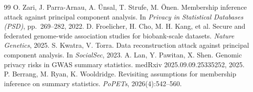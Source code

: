 \documentclass[11pt]{article}
\begin{document}
\begin{thebibliography}{99}
 O. Zari, J. Parra-Arnau, A. \"Unsal, T. Strufe, M. \"Onen. Membership inference attack against principal component analysis. In \emph{Privacy in Statistical Databases (PSD)}, pp.~269--282, 2022.
 D. Froelicher, H. Cho, M. H. Kang, et al. Secure and federated genome-wide association studies for biobank-scale datasets. \emph{Nature Genetics}, 2025.
 S. Kwatra, V. Torra. Data reconstruction attack against principal component analysis. In \emph{SocialSec}, 2023.
 A. Lan, Y. Pawitan, X. Shen. Genomic privacy risks in GWAS summary statistics. medRxiv 2025.09.09.25335252, 2025.
 P. Berrang, M. Ryan, K. Wooldridge. Revisiting assumptions for membership inference on summary statistics. \emph{PoPETs}, 2026(4):542--560.
\end{thebibliography}
\end{document}
